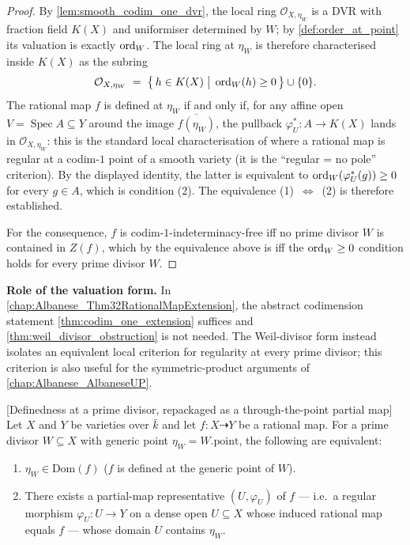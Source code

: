 \begin{proof}
  
  By \cref{lem:smooth_codim_one_dvr}, the local ring \(\mathcal O_{X, \eta_W}\) is a
  DVR with fraction field \(K(X)\) and uniformiser determined by \(W\); by
  \cref{def:order_at_point} its valuation is exactly \(\operatorname{ord}_W\). The local ring at
  \(\eta_W\) is therefore characterised inside \(K(X)\) as the subring
  \[
    \mathcal O_{X, \eta_W} \;=\; \bigl\{\, h \in K(X) \;\big|\; \operatorname{ord}_W(h) \geq 0
    \,\bigr\} \cup \{0\}.
  \]
  The rational map \(f\) is defined at \(\eta_W\) if and only if, for any affine open
  \(V = \operatorname{Spec} A \subseteq Y\) around the image \(\overline{f(\eta_W)}\),
  the pullback \(\varphi_U^\ast \colon A \to K(X)\) lands in
  \(\mathcal O_{X, \eta_W}\): this is the standard local characterisation of where a
  rational map is regular at a codim-\(1\) point of a smooth variety (it is the
  ``regular = no pole'' criterion). By the displayed identity, the latter is
  equivalent to \(\operatorname{ord}_W(\varphi_U^\ast(g)) \geq 0\) for every \(g \in A\), which is
  condition (2). The equivalence (1)~\(\Leftrightarrow\)~(2) is therefore established.

  For the consequence, \(f\) is codim-\(1\)-indeterminacy-free iff no prime divisor \(W\) is
  contained in \(Z(f)\), which by the equivalence above is iff the \(\operatorname{ord}_W \geq 0\)
  condition holds for every prime divisor \(W\).
\end{proof}

\begin{remark}
  \label{rmk:weil_obstruction_application}
  \textbf{Role of the valuation form.} In
  \cref{chap:Albanese_Thm32RationalMapExtension}, the abstract codimension statement
  \cref{thm:codim_one_extension} suffices and \cref{thm:weil_divisor_obstruction}
  is not needed. The Weil-divisor form instead isolates an equivalent local
  criterion for regularity at every prime divisor; this criterion is also useful
  for the symmetric-product arguments of \cref{chap:Albanese_AlbaneseUP}.
\end{remark}

\begin{lemma}


  [Definedness at a prime divisor, repackaged as a through-the-point partial map]
  \label{lem:mem_domain_partial_map_reshuffle}
  Let \(X\) and \(Y\) be varieties over \(\bar k\) and let
  \(f \colon X \dashrightarrow Y\) be a rational map. For a prime divisor
  \(W \subseteq X\) with generic point \(\eta_W = W.\mathrm{point}\), the
  following are equivalent:
  \begin{enumerate}
    \item \(\eta_W \in \mathrm{Dom}(f)\) (\(f\) is defined at the generic point of
      \(W\)).
    \item There exists a partial-map representative \((U, \varphi_U)\) of \(f\) ---
      i.e.\ a regular morphism \(\varphi_U \colon U \to Y\) on a dense open
      \(U \subseteq X\) whose induced rational map equals \(f\) --- whose domain
      \(U\) contains \(\eta_W\).
  \end{enumerate}
\end{lemma}


